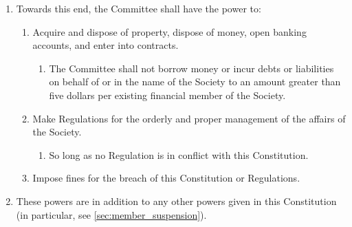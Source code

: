 \documentclass[a4paper]{article}
\begin{document}
\begin{enumerate}
    \item Towards this end, the Committee shall have the power to:
    \begin{enumerate}
        \item Acquire and dispose of property, dispose of money, open banking accounts, and enter into contracts.
        \begin{enumerate}
            \item The Committee shall not borrow money or incur debts or liabilities on behalf of or in the name of the Society to an amount greater than five dollars per existing financial member of the Society.
        \end{enumerate}
        \item Make Regulations for the orderly and proper management of the affairs of the Society.
        \begin{enumerate}
            \item So long as no Regulation is in conflict with this Constitution.
        \end{enumerate}
        \item Impose fines for the breach of this Constitution or Regulations.
    \end{enumerate}
    \item These powers are in addition to any other powers given in this Constitution (in particular, see \cref{sec:member_suspension}).
\end{enumerate}
\end{document}
